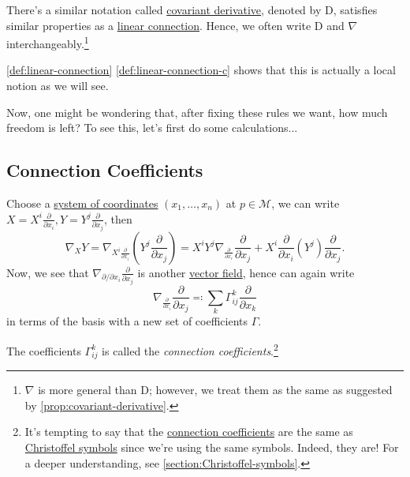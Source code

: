 \begin{note}
	There's a similar notation called \hyperref[def:covariant-derivative]{covariant derivative}, denoted by \(\mathrm{D} \), satisfies similar properties as a \hyperref[def:linear-connection]{linear connection}. Hence, we often write \(\mathrm{D} \) and \(\nabla \) interchangeably.\footnote{\(\nabla \) is more general than \(\mathrm{D}\); however, we treat them as the same as suggested by \autoref{prop:covariant-derivative}.}
\end{note}

\begin{remark}
	\autoref{def:linear-connection} \autoref{def:linear-connection-c} shows that this is actually a local notion as we will see.
\end{remark}

Now, one might be wondering that, after fixing these rules we want, how much freedom is left? To see this, let's first do some calculations...

\subsection{Connection Coefficients}
Choose a \hyperref[def:coordinate-chart]{system of coordinates} \((x_1, \ldots , x_n)\) at \(p\in \mathcal{M} \), we can write \(X = X^i \frac{\partial }{\partial x_i}, Y = Y^j \frac{\partial }{\partial x_j}\), then
\[
	\nabla _X Y
	= \nabla _{X^i \frac{\partial }{\partial x_i} } \left( Y^j \frac{\partial }{\partial x_j}  \right)
	= X^i Y^j \nabla _{\frac{\partial }{\partial x_i}} \frac{\partial }{\partial x_j} + X^i \frac{\partial }{\partial x_i}(Y^j)  \frac{\partial }{\partial x_j}.
\]
Now, we see that \(\nabla _{\partial / \partial x_i} \frac{\partial }{\partial x_j}\) is another \hyperref[def:vector-field]{vector field}, hence can again write
\[
	\nabla _{\frac{\partial }{\partial x_i}} \frac{\partial }{\partial x_j} \eqqcolon \sum_{k} \Gamma ^k_{ij} \frac{\partial }{\partial x_k}
\]
in terms of the basis with a new set of coefficients \(\Gamma \).

\begin{notation}\label{not:connection-coefficient}
	The coefficients \(\Gamma ^k_{ij}\) is called the \emph{connection coefficients}.\footnote{It's tempting to say that the \hyperref[not:connection-coefficient]{connection coefficients} are the same as \hyperref[not:Christoffel-symbol]{Christoffel symbols} since we're using the same symbols. Indeed, they are! For a deeper understanding, see \autoref{section:Christoffel-symbols}.}
\end{notation}

